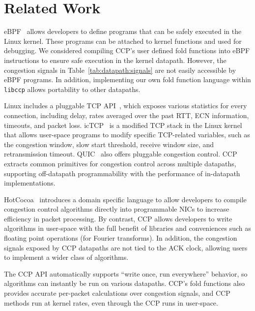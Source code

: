 \section{Related Work}
\label{s:relwork}

eBPF~\cite{ebpf} allows developers to define programs that can be safely executed in the Linux kernel. These programs can be attached to kernel functions and used for debugging. We considered compiling CCP's user defined fold functions into eBPF instructions to ensure safe execution in the kernel datapath. However, the congestion signals in Table~\ref{tab:datapath:signals} are not easily accessible by eBPF programs. In addition, implementing our own fold function language within \texttt{libccp} allows portability to other datapaths. 

Linux includes a pluggable TCP API~\cite{lwn-pluggable-tcp}, which exposes various statistics for every connection, including delay, rates averaged over the past RTT, ECN information, timeouts, and packet loss. 
icTCP~\cite{icTCP} is a modified TCP stack in the Linux kernel that allows user-space programs to modify specific TCP-related variables, such as the congestion window, slow start threshold, receive window size, and retransmission timeout. QUIC~\cite{quic} also offers pluggable congestion control. CCP extracts common primitives for congestion control across multiple datapaths, supporting off-datapath programmability with the performance of in-datapath implementations.

HotCocoa~\cite{hotcocoa} introduces a domain specific language to allow developers to compile congestion control algorithms directly into  programmable NICs to increase efficiency in packet processing. By contrast, CCP allows developers to write algorithms in user-space with the full benefit of libraries and conveniences such as  floating point operations (\eg for Fourier transforms). 
In addition, the congestion signals exposed by CCP datapaths are not tied to the ACK clock, allowing users to implement a wider class of algorithms. 

The CCP API automatically supports ``write once, run everywhere'' behavior, so algorithms can instantly be run on various datapaths. CCP's fold functions also provides accurate per-packet calculations over congestion signals, and CCP methods run at kernel rates, even through the CCP runs in user-space.
\fi

